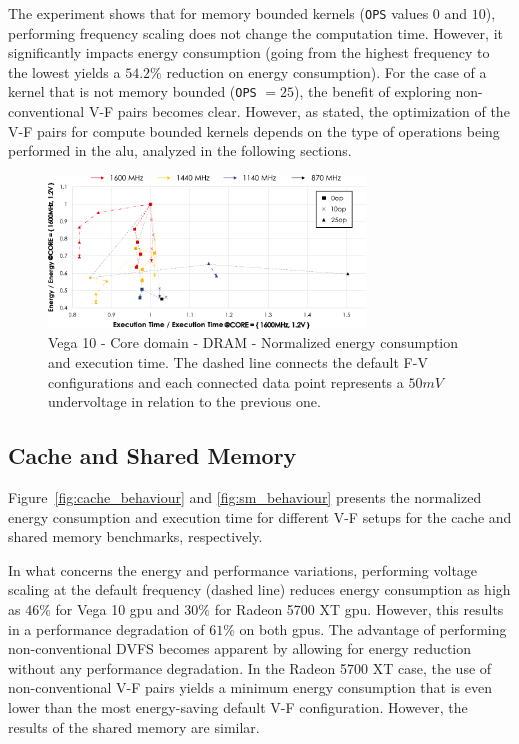 The experiment shows that for memory bounded kernels (\texttt{OPS} values $0$ and $10$), performing frequency scaling does not change the computation time. However, it significantly impacts energy consumption (going from the highest frequency to the lowest yields a $54.2\%$ reduction on energy consumption). For the case of a kernel that is not memory bounded  (\texttt{OPS} $=25$), the benefit of exploring non-conventional V-F pairs becomes clear. However, as stated, the optimization of the V-F pairs for compute bounded kernels depends on the type of operations being performed in the \acrshort{alu}, analyzed in the following sections.

\begin{figure}[htb]
  \centering
  \includegraphics[width=0.75\textwidth]{Figures/GPU_characterization/DRAM_Core_domain_behaviour.pdf}
  \caption{Vega 10 - Core domain - DRAM - Normalized energy consumption and execution time. The dashed line connects the default F-V configurations and each connected data point represents a $50mV$ undervoltage in relation to the previous one.}
  \label{fig:DRAM_Corebehaviour}
\end{figure}


\subsection{Cache and Shared Memory}

\label{sec:cache_sm__behaviour}

Figure~\ref{fig:cache_behaviour} and \ref{fig:sm_behaviour} presents the normalized energy consumption and execution time for different V-F setups for the cache and shared memory benchmarks, respectively.  

In what concerns the energy and performance variations, performing voltage scaling at the default frequency (dashed line) reduces energy consumption as high as $46\% $ for Vega 10 \acrshort{gpu} and $30\% $ for Radeon 5700 XT \acrshort{gpu}. However, this results in a performance degradation of $61\%$ on both \acrshort{gpu}s. The advantage of performing non-conventional DVFS becomes apparent by allowing for energy reduction without any performance degradation. 
In the Radeon 5700 XT case, the use of non-conventional V-F pairs yields a minimum energy consumption that is even lower than the most energy-saving default V-F configuration.
However, the results of the shared memory are similar.

